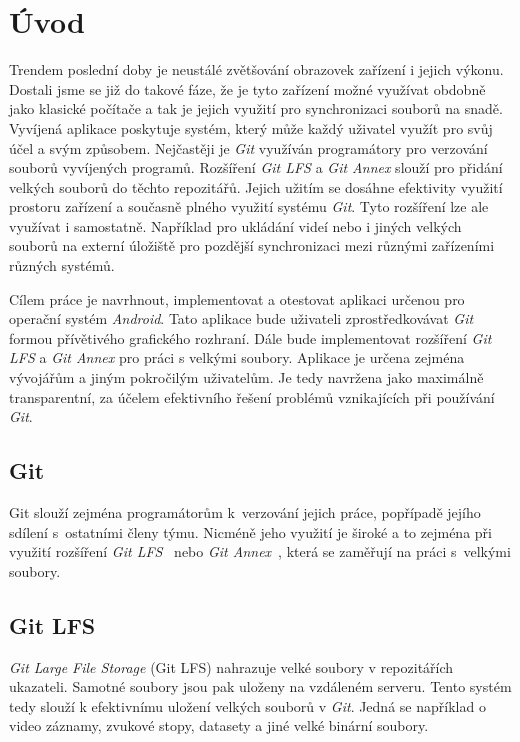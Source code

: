 \chapter{Úvod}
Trendem poslední doby je neustálé zvětšování obrazovek zařízení i jejich výkonu. Dostali jsme se již do takové fáze, že je tyto zařízení možné využívat obdobně jako klasické počítače a tak je jejich využití pro synchronizaci souborů na snadě.
Vyvíjená aplikace poskytuje systém, který může každý uživatel využít pro svůj účel a svým způsobem. Nejčastěji je \emph{Git} využíván programátory pro verzování souborů vyvíjených programů. Rozšíření \emph{Git LFS} a \emph{Git Annex} slouží pro přidání velkých souborů do těchto repozitářů. Jejich užitím se dosáhne efektivity využití prostoru zařízení a současně plného využití systému \emph{Git}. Tyto rozšíření lze ale využívat i samostatně. Například pro ukládání videí nebo i jiných velkých souborů na externí úložiště pro pozdější synchronizaci mezi různými zařízeními různých systémů.

Cílem práce je navrhnout, implementovat a otestovat aplikaci určenou pro operační systém \emph{Android}. Tato aplikace bude uživateli zprostředkovávat \emph{Git} formou přívětivého grafického rozhraní. Dále bude implementovat rozšíření \emph{Git LFS} a \emph{Git Annex} pro práci s velkými soubory. Aplikace je určena zejména vývojářům a jiným pokročilým uživatelům. Je tedy navržena jako maximálně transparentní, za účelem efektivního řešení problémů vznikajících při používání \emph{Git}.
\newpage
\section{Git}
Git slouží zejména programátorům k verzování jejich práce, popřípadě jejího sdílení s ostatními členy týmu. Nicméně jeho využití je široké a to zejména při využití rozšíření \emph{Git LFS}~\cite{git-lfs} nebo \emph{Git Annex}~\cite{git-annex}, která se zaměřují na práci s velkými soubory.

\section{Git LFS}
\emph{Git Large File Storage} (Git LFS) nahrazuje velké soubory v repozitářích ukazateli. Samotné soubory jsou pak uloženy na vzdáleném serveru. Tento systém tedy slouží k efektivnímu uložení velkých souborů v \emph{Git}. Jedná se například o video záznamy, zvukové stopy, datasety a jiné velké binární soubory.

